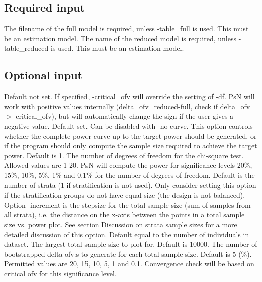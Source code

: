 \subsection{Required input}
\begin{optionlist}
The filename of the full model is required, unless -table\_full is used. This must be an estimation model.
\nextopt
{}
The name of the reduced model is required, unless -table\_reduced is used. This must be an estimation model.
\nextopt
\end{optionlist}
\subsection{
	Optional input}
\begin{optionlist}
Default not set. If specified, -critical\_ofv will override the setting of -df. PsN will work with positive values internally (delta\_ofv=reduced-full, check if delta\_ofv $>$ critical\_ofv), but will automatically change the sign if the user gives a negative value. 
\nextopt
{}
Default set. Can be disabled with -no-curve. This option controls whether the complete power curve up to the target power should be generated, or if the program should only compute the sample size required to achieve the target power. 
\nextopt
{}
Default is 1. The number of degrees of freedom for the chi-square test. Allowed values are 1-20. PsN will compute the power for significance levels 20\%, 15\%, 10\%, 5\%, 1\% and 0.1\% for the number of degrees of freedom. 
\nextopt
{}
Default is the number of strata (1 if stratification is not used). Only consider setting this option if the stratification groups do not have equal size (the design is not balanced). Option -increment is the stepsize for the total sample size (sum of samples from all strata), i.e. the distance on the x-axis between the points in a total sample size vs. power plot. See section Discussion on strata sample sizes for a more detailed discussion of this option. 
\nextopt
{}
Default equal to the number of individuals in dataset. The largest total sample size to plot for.  
\nextopt
{}
Default is 10000. The number of bootstrapped delta-ofv:s to generate for each total sample size. 
\nextopt
{}
Default is 5 (\%). Permitted values are 20, 15, 10, 5, 1 and 0.1. Convergence check will be based on critical ofv for this significance level. 

\end{optionlist}
